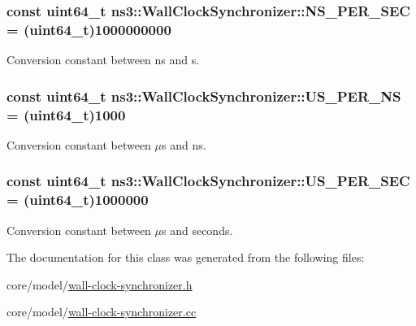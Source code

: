 \subsubsection[{\texorpdfstring{N\+S\+\_\+\+P\+E\+R\+\_\+\+S\+EC}{NS_PER_SEC}}]{\setlength{\rightskip}{0pt plus 5cm}const uint64\+\_\+t ns3\+::\+Wall\+Clock\+Synchronizer\+::\+N\+S\+\_\+\+P\+E\+R\+\_\+\+S\+EC = (uint64\+\_\+t)1000000000\hspace{0.3cm}{\ttfamily [static]}}\hypertarget{classns3_1_1WallClockSynchronizer_a0bc6842f16741bda7ddea6fec357bbfd}{}\label{classns3_1_1WallClockSynchronizer_a0bc6842f16741bda7ddea6fec357bbfd}
Conversion constant between ns and s. 
\subsubsection[{\texorpdfstring{U\+S\+\_\+\+P\+E\+R\+\_\+\+NS}{US_PER_NS}}]{\setlength{\rightskip}{0pt plus 5cm}const uint64\+\_\+t ns3\+::\+Wall\+Clock\+Synchronizer\+::\+U\+S\+\_\+\+P\+E\+R\+\_\+\+NS = (uint64\+\_\+t)1000\hspace{0.3cm}{\ttfamily [static]}}\hypertarget{classns3_1_1WallClockSynchronizer_a80981ddf6a087e35edc1e70b2d00ab21}{}\label{classns3_1_1WallClockSynchronizer_a80981ddf6a087e35edc1e70b2d00ab21}
Conversion constant between {$\mu$}s and ns. 
\subsubsection[{\texorpdfstring{U\+S\+\_\+\+P\+E\+R\+\_\+\+S\+EC}{US_PER_SEC}}]{\setlength{\rightskip}{0pt plus 5cm}const uint64\+\_\+t ns3\+::\+Wall\+Clock\+Synchronizer\+::\+U\+S\+\_\+\+P\+E\+R\+\_\+\+S\+EC = (uint64\+\_\+t)1000000\hspace{0.3cm}{\ttfamily [static]}}\hypertarget{classns3_1_1WallClockSynchronizer_aaa1f121f1d08784569031c9ddd8606e7}{}\label{classns3_1_1WallClockSynchronizer_aaa1f121f1d08784569031c9ddd8606e7}
Conversion constant between {$\mu$}s and seconds. 

The documentation for this class was generated from the following files\+:\begin{DoxyCompactItemize}
\item 
core/model/\hyperlink{wall-clock-synchronizer_8h}{wall-\/clock-\/synchronizer.\+h}\item 
core/model/\hyperlink{wall-clock-synchronizer_8cc}{wall-\/clock-\/synchronizer.\+cc}\end{DoxyCompactItemize}
